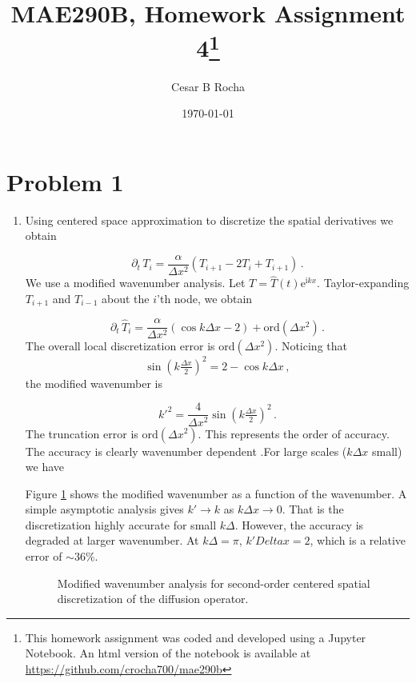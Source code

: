 \documentclass[11pt]{article}
\title{MAE290B, Homework Assignment 4\footnote{This homework assignment was coded and developed using a Jupyter Notebook. An html version of the notebook is available at \href{https://github.com/crocha700/mae290b}{https://github.com/crocha700/mae290b}}}
\author{Cesar B Rocha}
\date{\today}
\newcommand{\ord}{\mbox{ord}}
\newcommand{\ii}{\mathrm{i}}
\newcommand{\ee}{\mathrm{e}}
\newcommand{\com}{\, ,}
\newcommand{\per}{\, .}
\def\beq{\begin{equation}}
\def\eeq{\end{equation}}
\begin{document}
\maketitle

\section*{Problem 1}

\begin{enumerate}[label=(\alph*)]

    \item Using centered space approximation to discretize the spatial derivatives we obtain

        \beq
            \label{diff_discret_space}
            \partial_t \,T_i = \frac{\alpha}{\Delta x^2}\left(T_{i+1}-2T_i + T_{i+1}\right)\per
        \eeq
        We use a modified wavenumber analysis. Let $T = \hat{T}(t)\ee^{\ii k x}$. Taylor-expanding $T_{i+1}$ and $T_{i-1}$  about the $i$'th node, we obtain 
      
        \beq
            \label{diff_discret_space_mod}
            \partial_t \,\hat{T}_i = \frac{\alpha}{\Delta x^2}\left(\cos k\Delta x - 2\right) + \ord{(\Delta x^2)}\per
        \eeq
        The overall local discretization error is $\ord{(\Delta x^2)}$. Noticing that
        \beq
        \sin \left(k \tfrac{\Delta x}{2}\right)^2 = 2 - \cos k \Delta x\com
        \eeq
        the modified wavenumber is

        \beq
            \label{mod_k}
            k'^2 = \frac{4}{\Delta x^2}\sin \left(k \tfrac{\Delta x}{2}\right)^2\per
        \eeq
        The truncation error is $\ord{(\Delta x^2)}$. This represents the order of accuracy. The accuracy is clearly wavenumber dependent .For large scales ($k \Delta x$ small) we have

        Figure \ref{fig_mod_k} shows the modified wavenumber as a function of the wavenumber. A simple asymptotic analysis gives  $k'\to k$ as $k\Delta x \to 0$. That is the discretization highly accurate for small $k\Delta$. However, the accuracy is degraded at larger wavenumber. At $k\Delta=\pi$, $k'Delta x= 2$, which is a relative error of $\sim36\%$.
    
\begin{figure}[ht]
\centerline{}
\caption{Modified wavenumber analysis for second-order centered spatial discretization of the diffusion operator.}
    \label{fig_mod_k}
\end{figure}


\end{enumerate}
\end{document}
